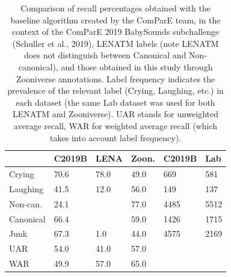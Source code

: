 \documentclass[english,,man]{apa6}
\begin{document}
\begin{table}

\caption{\label{tab:tab-LENA-challenge}Comparison of recall percentages obtained with the baseline algorithm created by the ComParE team, in the context of the ComParE 2019 BabySounds subchallenge (Schuller et al., 2019), LENATM labels (note LENATM does not distinguish between Canonical and Non-canonical), and those obtained in this study through Zooniverse annotations. Label frequency indicates the prevalence of the relevant label (Crying, Laughing, etc.) in each dataset (the same Lab dataset was used for both LENATM and Zooniverse). UAR stands for unweighted average recall, WAR for weighted average recall (which takes into account label frequency).}
\centering
\begin{tabular}[t]{l|l|l|l|l|l}
\hline
 & C2019B & LENA & Zoon. & C2019B & Lab\\
\hline
Crying & 70.6 & 78.0 & 49.0 & 669 & 581\\
\cline{1-6}
Laughing & 41.5 & 12.0 & 56.0 & 149 & 137\\
\cline{1-6}
Non-can. & 24.1 &  & 77.0 & 4485 & 5512\\
\cline{1-2}
\cline{4-6}
Canonical & 66.4 & \multirow{-2}{*}{\raggedright\arraybackslash 73.0} & 59.0 & 1426 & 1715\\
\cline{1-6}
Junk & 67.3 & 1.0 & 44.0 & 4575 & 2169\\
\cline{1-6}
UAR & 54.0 & 41.0 & 57.0 &  & \\
\cline{1-4}
WAR & 49.9 & 57.0 & 65.0 & \multirow{-2}{*}{\raggedright\arraybackslash } & \multirow{-2}{*}{\raggedright\arraybackslash }\\
\hline
\end{tabular}
\end{table}
\end{document}
